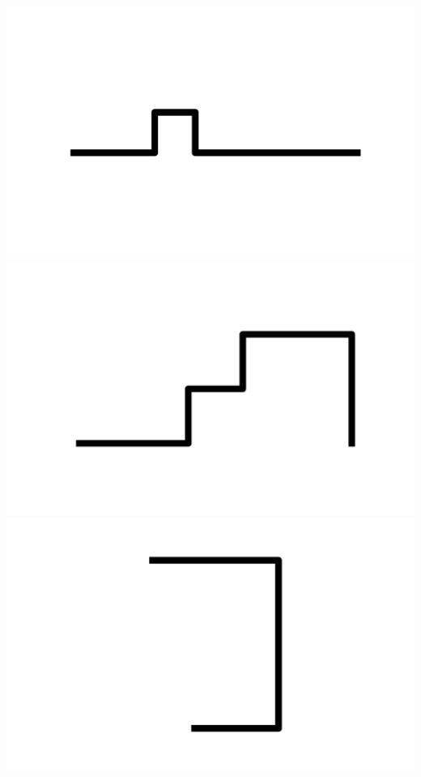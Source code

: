 \documentclass[]{report}
\begin{document}
\includegraphics[scale=.1]{pictures/21/state_cluster_shapes_142.pdf} 
\includegraphics[scale=.1]{pictures/21/state_cluster_shapes_143.pdf} 
\includegraphics[scale=.1]{pictures/21/state_cluster_shapes_144.pdf} 
\end{document}
